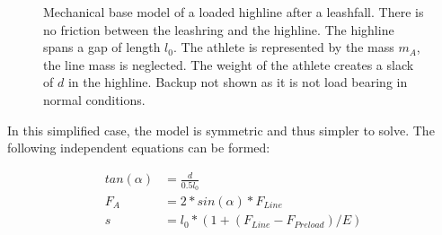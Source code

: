 \documentclass[a4paper,10pt]{scrartcl}
\begin{document}
\begin{figure}[ht]
\centering
{}
\caption{Mechanical base model of a loaded highline after a leashfall. There is no friction between the leashring and the highline. The highline spans a gap of length $l_0$. The athlete is represented by the mass $m_A$, the line mass is neglected. The weight of the athlete creates a slack of $d$ in the highline. Backup not shown as it is not load bearing in normal conditions.}
\label{fig::2d::highline::noFric}
\end{figure}

In this simplified case, the model is symmetric and thus simpler to solve. The following independent equations can be formed:

\begin{align*}
tan(\alpha) &= \frac{d}{0.5l_0} \\
F_A &= 2*sin(\alpha)*F_{Line}\\
s &= l_0*(1+(F_{Line}-F_{Preload})/E) 
\end{align*}
\end{document}
